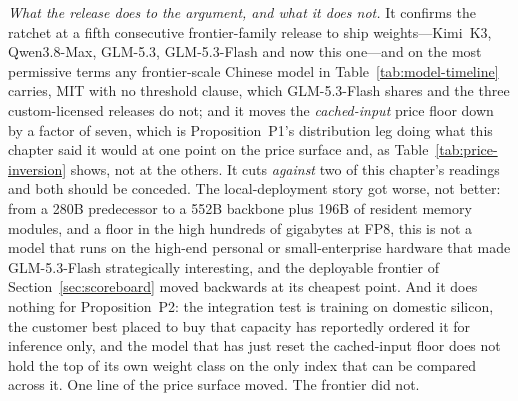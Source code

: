 \emph{What the release does to the argument, and what it does not.} It confirms the ratchet at a fifth consecutive frontier-family release to ship weights---Kimi~K3, Qwen3.8-Max, GLM-5.3, GLM-5.3-Flash and now this one---and on the most permissive terms any frontier-scale Chinese model in Table~\ref{tab:model-timeline} carries, MIT with no threshold clause, which GLM-5.3-Flash shares and the three custom-licensed releases do not; and it moves the \emph{cached-input} price floor down by a factor of seven, which is Proposition~P1's distribution leg doing what this chapter said it would at one point on the price surface and, as Table~\ref{tab:price-inversion} shows, not at the others. It cuts \emph{against} two of this chapter's readings and both should be conceded. The local-deployment story got worse, not better: from a 280B predecessor to a 552B backbone plus 196B of resident memory modules, and a floor in the high hundreds of gigabytes at FP8, this is not a model that runs on the high-end personal or small-enterprise hardware that made GLM-5.3-Flash strategically interesting, and the deployable frontier of Section~\ref{sec:scoreboard} moved backwards at its cheapest point. And it does nothing for Proposition~P2: the integration test is training on domestic silicon, the customer best placed to buy that capacity has reportedly ordered it for inference only, and the model that has just reset the cached-input floor does not hold the top of its own weight class on the only index that can be compared across it. One line of the price surface moved. The frontier did not.

